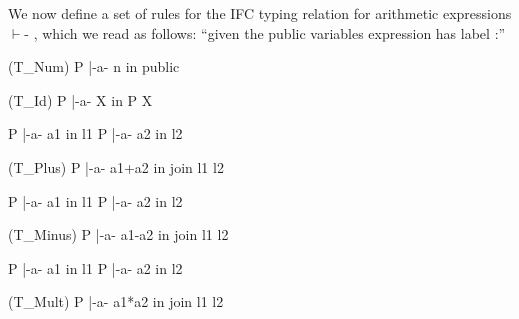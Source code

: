 \documentclass[12pt]{report}
\begin{document}
We now define a set of rules for the IFC typing relation for
    arithmetic expressions  \ensuremath{\vdash}-   , which we read as follows:
    ``given the public variables  expression  has label :'' 

\par
\noindent\hrulefill\par
\noindent{}                  (T\_Num)
                          P |-a- n in public
\par
\noindent\hrulefill\par
\noindent{}                    (T\_Id)
                           P |-a- X in P X


                  P |-a- a1 in l1    P |-a- a2 in l2
\par
\noindent\hrulefill\par
\noindent{}        (T\_Plus)
                      P |-a- a1+a2 in join l1 l2


                  P |-a- a1 in l1    P |-a- a2 in l2
\par
\noindent\hrulefill\par
\noindent{}       (T\_Minus)
                      P |-a- a1-a2 in join l1 l2


                  P |-a- a1 in l1    P |-a- a2 in l2
\par
\noindent\hrulefill\par
\noindent{}        (T\_Mult)
                      P |-a- a1*a2 in join l1 l2
\end{document}
